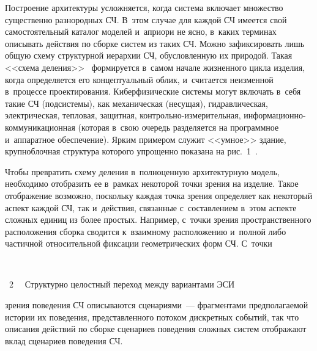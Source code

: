 \begin{multicols}{2}
Построение архитектуры усложняется, когда сис\-те\-ма включает множество 
существенно разнородных СЧ. В~этом случае для каж\-дой СЧ имеется свой 
самостоятельный каталог моделей и~априори не ясно, в~каких терминах 
описывать действия по сборке сис\-тем из таких СЧ. Можно зафиксировать лишь 
общую схему структурной иерархии СЧ, обуслов\-лен\-ную их природой. Такая 
<<схема деления>>~\cite{8-kov} формируется в~самом начале жизненного 
цикла изделия, когда определяется его концептуальный облик, и~считается 
неизменной в~процессе проектирования. Киберфизические системы могут 
включать в~себя такие СЧ (подсистемы), как механическая (несущая), 
гидравлическая, электрическая, тепловая, защитная,  
конт\-роль\-но-из\-ме\-ри\-тель\-ная,  
ин\-фор\-ма\-ци\-он\-но-ком\-му\-ни\-ка\-ци\-он\-ная (которая в~свою очередь 
разделяется на программное и~аппаратное обеспечение). Ярким примером 
служит <<умное>> здание, крупноблочная структура которого упрощенно 
показана на рис.~1~\cite{9-kov}.




Чтобы превратить схему деления в~полноценную архитектурную модель, 
необходимо отобразить ее в~рамках некоторой точки зрения на изделие. Такое 
отображение возможно, поскольку каж\-дая точка зрения определяет как 
некоторый аспект каждой СЧ, так и~действия, связанные с~составлением 
в~этом аспекте сложных единиц из более прос\-тых. Например, с~точки зрения 
пространственного расположения сборка сводится к~взаимному расположению 
и~полной либо частичной относительной фиксации геометрических форм СЧ. 
С~точки\linebreak\vspace*{-9pt}


{ \begin{center}  %
 \vspace*{-1pt}
   \mbox{%
\epsfxsize=78.413mm 
}

\end{center}

\noindent
{{\figurename~2}\ \ \small{
Структурно целостный переход между вариантами ЭСИ
}}}

\vspace*{18pt}

\noindent
 зрения поведения СЧ описываются сценариями~--- фрагментами 
предполагаемой истории их поведения, представленного потоком дискретных 
событий, так что описания действий по сборке \mbox{сценариев} поведения сложных 
систем отображают вклад сценариев поведения СЧ.






\end{multicols}
